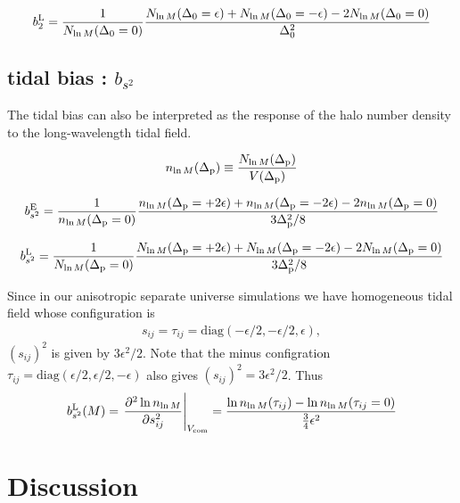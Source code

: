 \documentclass[a4paper,11pt]{article}
\begin{document}
\begin{align}
b^{\rm L}_{2}
= \frac{1}{N_{\ln{M}}(\Delta_0=0)}
\frac{N_{\ln{M}}(\Delta_0=\epsilon)
+
N_{\ln{M}}(\Delta_0=-\epsilon)
-2N_{\ln{M}}(\Delta_0=0)}{\Delta^2_0}
\end{align}


\subsection{tidal bias : $b_{s^2}$}

The tidal bias can also be interpreted as the response of the halo number density
to the long-wavelength tidal field.

\begin{align}
n_{\ln{M}}(\Delta_{\rm p}) \equiv
\frac{N_{\ln{M}}(\Delta_{\rm p})}{V(\Delta_{\rm p})}
\end{align}

\begin{align}
b^{\rm E}_{s^2}
= \frac{1}{n_{\ln{M}}(\Delta_{\rm p}=0)}
\frac{n_{\ln{M}}(\Delta_{\rm p}=+2\epsilon)
+
n_{\ln{M}}(\Delta_{\rm p}=-2\epsilon)
-2n_{\ln{M}}(\Delta_{\rm p}=0)}{3\Delta^2_{\rm p}/8}
\end{align}


\begin{align}
b^{\rm L}_{s^2}
= \frac{1}{N_{\ln{M}}(\Delta_{\rm p}=0)}
\frac{N_{\ln{M}}(\Delta_{\rm p}=+2\epsilon)
+
N_{\ln{M}}(\Delta_{\rm p}=-2\epsilon)
-2N_{\ln{M}}(\Delta_{\rm p}=0)}{3\Delta^2_{\rm p}/8}
\end{align}


Since in our anisotropic separate universe simulations we have homogeneous tidal field whose configuration is
\begin{align}
s_{ij} = \tau_{ij} = \mathrm{diag}(-\epsilon/2,-\epsilon/2,\epsilon),
\end{align}
$(s_{ij})^2$ is given by $3\epsilon^2/2$.
Note that the minus configration $\tau_{ij} = \mathrm{diag}(\epsilon/2,\epsilon/2,-\epsilon)$ also gives $(s_{ij})^2 = 3\epsilon^2/2$.
Thus
\begin{align}
b_{s^2}^{\rm L}(M) = \left.\frac{\partial^2 \ln{ n_{\ln{M} } } }{\partial s_{ij}^2}\right|_{V_{\rm com}}=
\frac{\ln{ n_{\ln{M} }(\tau_{ij}) } -\ln{ n_{\ln{M} }(\tau_{ij}=0) }  }{\frac{3}{4}\epsilon^2}
\end{align}

\section{Discussion}
\label{sec:discuss}
\end{document}
